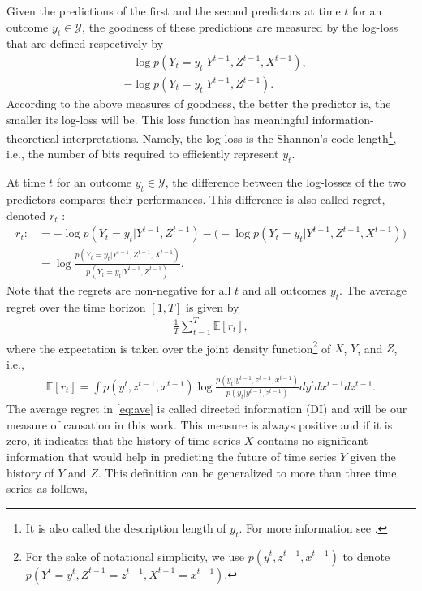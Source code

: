Given the predictions of the first and the second predictors at time $t$ for an outcome $y_t\in \mathcal{Y}$, the goodness of these predictions are measured by the log-loss that are defined respectively by 
\begin{align*}
    &-\log p(Y_t=y_t|Y^{t-1},Z^{t-1},X^{t-1}),\\
    &-\log p(Y_t=y_t|Y^{t-1},Z^{t-1}).
\end{align*}
According to the above measures of goodness, the better the predictor is, the smaller its log-loss will be.
This loss function has meaningful information-theoretical interpretations.
Namely, the log-loss is the Shannon's code length\footnote{It is also called the description length of $y_t$. For more information see \citet{cover2012elements}.}, i.e., the number of bits required to efficiently represent $y_t$. 

At time $t$ for an outcome $y_t\in \mathcal{Y}$, the difference between the log-losses of the two predictors compares their performances.  This difference is also called regret, denoted $r_t$ :
\begin{align}
r_t:&=-\log{p(Y_t=y_t|Y^{t-1},Z^{t-1})}-\big(-\log {p(Y_t=y_t|Y^{t-1},Z^{t-1},X^{t-1})}\big) \nonumber \\
&=\log \frac{p(Y_t=y_t|Y^{t-1},Z^{t-1},X^{t-1})}{p(Y_t=y_t|Y^{t-1},Z^{t-1})}.
\end{align}
Note that the regrets are non-negative for all $t$ and all outcomes $y_t$.
The average regret over the time horizon $[1,T]$ is given by 
\begin{align}\label{eq:ave}
   \frac{1}{T}\sum_{t=1}^T \mathbb{E}[r_t],
\end{align}
where the expectation is taken over the joint density function\footnote{For the sake of notational simplicity, we use $p(y^{t},z^{t-1},x^{t-1})$ to denote $p(Y^{t}=y^{t},Z^{t-1}=z^{t-1},X^{t-1}=x^{t-1})$.} of $X$, $Y$, and $Z$, i.e., 
\begin{align}
    \mathbb{E}[r_t]=\int p(y^{t},z^{t-1},x^{t-1})\log \frac{p(y_t|y^{t-1},z^{t-1},x^{t-1})}{p(y_t|y^{t-1},z^{t-1})}dy^tdx^{t-1}dz^{t-1}.
\end{align}
The average regret in \eqref{eq:ave} is called directed information (DI) and will be our measure of causation in this work.
This measure is always positive and if it is zero, it indicates that the history of time series $X$ contains no significant information that would help in predicting the future of time series $Y$ given the history of $Y$ and $Z$. 
This definition can be generalized to more than three time series as follows,

